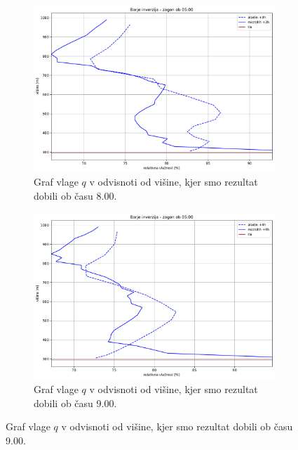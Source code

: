\documentclass[mat2, tisk]{fmfdelo}
\begin{document}
\begin{figure}[h!]
  \centering
  \begin{subfigure}[b]{1\textwidth}
    \centering
    \includegraphics[width=\textwidth]{rezultati/rh_barje_long_3.pdf}
    \caption{Graf vlage $q$ v odvisnoti od višine, kjer smo 
    rezultat dobili ob času 8.00.}
    \label{fig:planica}
  \end{subfigure}\hfill
  \begin{subfigure}[b]{1\textwidth}
    \centering
    \includegraphics[width=\textwidth]{rezultati/rh_barje_long_4.pdf}
    \caption{Graf vlage $q$ v odvisnoti od višine, kjer smo 
    rezultat dobili ob času 9.00.}
    \label{fig:barje}
  \end{subfigure}
  \label{fig:orography_sidebyside}
\end{figure}
\end{document}
